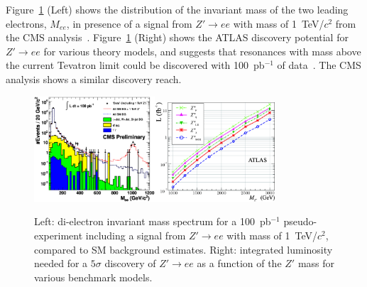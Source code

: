 \documentclass{cimento}
\begin{document}
Figure~\ref{fig:MeeAndZPrimeDisc} (Left) shows the distribution of 
the invariant mass of the two leading electrons, $M_{ee}$, in presence of 
a signal from $Z' \rightarrow ee$ with mass of 1~TeV/$c^2$
from the CMS analysis~\cite{HEEPNOTE}. 
Figure~\ref{fig:MeeAndZPrimeDisc} (Right)
shows the ATLAS discovery potential for 
$Z' \rightarrow ee$
for various theory models, and suggests that resonances with mass 
above the current Tevatron limit could be discovered with 
100~pb$^{-1}$ of data~\cite{HEEPNOTE}. 
The CMS analysis shows a similar discovery reach.
%
\begin{figure}[htbp] 
\centering
\includegraphics[width=0.4\textwidth]{st_mass_all_withZPrime_ALLTOPO.eps}\includegraphics[width=0.4\textwidth]{fig9L.eps}
\caption{Left: di-electron invariant mass spectrum for a 
100~pb$^{-1}$ pseudo-experiment including a signal from 
$Z' \rightarrow ee$ with mass of 1~TeV/$c^2$, 
compared to SM background estimates. Right: integrated 
luminosity needed for a $5\sigma$ discovery of $Z' \rightarrow ee$
as a function of the $Z'$ mass for various benchmark models.} 
\label{fig:MeeAndZPrimeDisc}
\end{figure}
%
\end{document}
